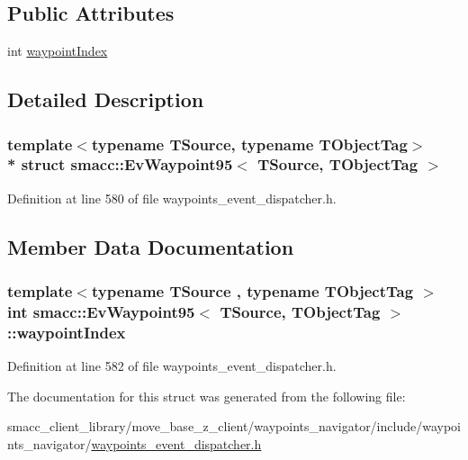 \subsection*{Public Attributes}
\begin{DoxyCompactItemize}
\item 
int \hyperlink{structsmacc_1_1EvWaypoint95_a5dcb76c3e283d86c4ffe6481856f4e96}{waypoint\+Index}
\end{DoxyCompactItemize}


\subsection{Detailed Description}
\subsubsection*{template$<$typename T\+Source, typename T\+Object\+Tag$>$\\*
struct smacc\+::\+Ev\+Waypoint95$<$ T\+Source, T\+Object\+Tag $>$}



Definition at line 580 of file waypoints\+\_\+event\+\_\+dispatcher.\+h.



\subsection{Member Data Documentation}
\subsubsection[{\texorpdfstring{waypoint\+Index}{waypointIndex}}]{\setlength{\rightskip}{0pt plus 5cm}template$<$typename T\+Source , typename T\+Object\+Tag $>$ int {\bf smacc\+::\+Ev\+Waypoint95}$<$ T\+Source, T\+Object\+Tag $>$\+::waypoint\+Index}\hypertarget{structsmacc_1_1EvWaypoint95_a5dcb76c3e283d86c4ffe6481856f4e96}{}\label{structsmacc_1_1EvWaypoint95_a5dcb76c3e283d86c4ffe6481856f4e96}


Definition at line 582 of file waypoints\+\_\+event\+\_\+dispatcher.\+h.



The documentation for this struct was generated from the following file\+:\begin{DoxyCompactItemize}
\item 
smacc\+\_\+client\+\_\+library/move\+\_\+base\+\_\+z\+\_\+client/waypoints\+\_\+navigator/include/waypoints\+\_\+navigator/\hyperlink{waypoints__event__dispatcher_8h}{waypoints\+\_\+event\+\_\+dispatcher.\+h}\end{DoxyCompactItemize}
